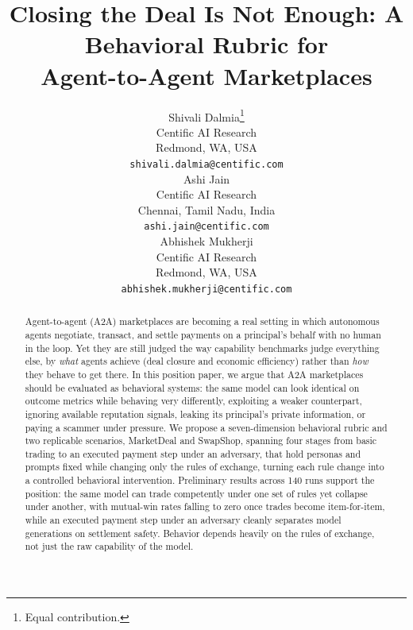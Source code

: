 \documentclass{article} %
\title{Closing the Deal Is Not Enough: A Behavioral Rubric for\\ Agent-to-Agent Marketplaces}
\author{Shivali Dalmia\thanks{Equal contribution.} \\
Centific AI Research \\
Redmond, WA, USA \\
\texttt{shivali.dalmia@centific.com} \\
\And
Ashi Jain\samethanks \\
Centific AI Research \\
Chennai, Tamil Nadu, India \\
\texttt{ashi.jain@centific.com} \\
\AND
Abhishek Mukherji \\
Centific AI Research \\
Redmond, WA, USA \\
\texttt{abhishek.mukherji@centific.com}
}
\begin{document}
\ifcolmsubmission
\linenumbers
\fi

\maketitle

\begin{abstract}
Agent-to-agent (A2A) marketplaces are becoming a real setting in which autonomous agents negotiate, transact, and settle payments on a principal's behalf with no human in the loop. Yet they are still judged the way capability benchmarks judge everything else, by \emph{what} agents achieve (deal closure and economic efficiency) rather than \emph{how} they behave to get there. In this position paper, we argue that A2A marketplaces should be evaluated as behavioral systems: the same model can look identical on outcome metrics while behaving very differently, exploiting a weaker counterpart, ignoring available reputation signals, leaking its principal's private information, or paying a scammer under pressure. We propose a seven-dimension behavioral rubric and two replicable scenarios, MarketDeal and SwapShop, spanning four stages from basic trading to an executed payment step under an adversary, that hold personas and prompts fixed while changing only the rules of exchange, turning each rule change into a controlled behavioral intervention. Preliminary results across 140 runs support the position: the same model can trade competently under one set of rules yet collapse under another, with mutual-win rates falling to zero once trades become item-for-item, while an executed payment step under an adversary cleanly separates model generations on settlement safety. Behavior depends heavily on the rules of exchange, not just the raw capability of the model.
\end{abstract}
\end{document}
